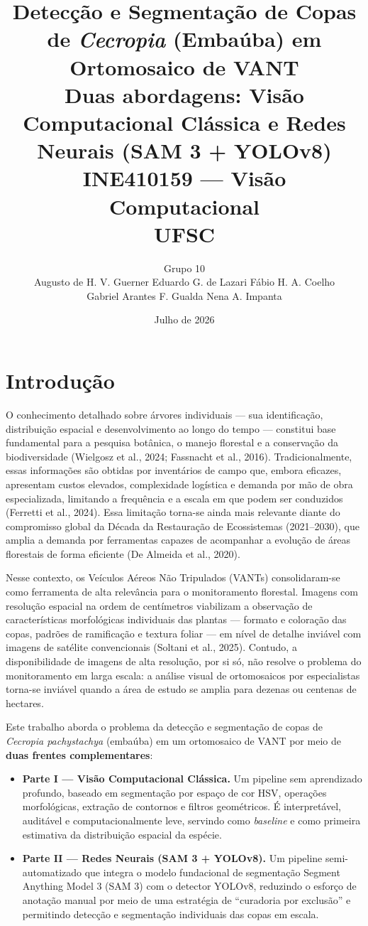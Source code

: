 \documentclass[12pt, a4paper]{article}
\title{
    \textbf{Detecção e Segmentação de Copas de \textit{Cecropia}
    (Embaúba) em Ortomosaico de VANT}\\[0.4em]
    \large Duas abordagens: Visão Computacional Clássica e
    Redes Neurais (SAM 3 + YOLOv8)\\[0.6em]
    \large INE410159 — Visão Computacional \\ UFSC
}
\author{Grupo 10 \\[0.3em]
\small Augusto de H. V. Guerner \quad Eduardo G. de Lazari \quad Fábio H. A. Coelho\\
\small Gabriel Arantes F. Gualda \quad Nena A. Impanta}
\date{Julho de 2026}
\begin{document}
\maketitle
\tableofcontents
\newpage

\section{Introdução}

O conhecimento detalhado sobre árvores individuais — sua identificação,
distribuição espacial e desenvolvimento ao longo do tempo — constitui base
fundamental para a pesquisa botânica, o manejo florestal e a conservação da
biodiversidade (Wielgosz et al., 2024; Fassnacht et al., 2016). Tradicionalmente,
essas informações são obtidas por inventários de campo que, embora eficazes,
apresentam custos elevados, complexidade logística e demanda por mão de obra
especializada, limitando a frequência e a escala em que podem ser conduzidos
(Ferretti et al., 2024). Essa limitação torna-se ainda mais relevante diante do
compromisso global da Década da Restauração de Ecossistemas (2021–2030), que
amplia a demanda por ferramentas capazes de acompanhar a evolução de áreas
florestais de forma eficiente (De Almeida et al., 2020).

Nesse contexto, os Veículos Aéreos Não Tripulados (VANTs) consolidaram-se como
ferramenta de alta relevância para o monitoramento florestal. Imagens com
resolução espacial na ordem de centímetros viabilizam a observação de
características morfológicas individuais das plantas — formato e coloração das
copas, padrões de ramificação e textura foliar — em nível de detalhe inviável com
imagens de satélite convencionais (Soltani et al., 2025). Contudo, a
disponibilidade de imagens de alta resolução, por si só, não resolve o problema do
monitoramento em larga escala: a análise visual de ortomosaicos por especialistas
torna-se inviável quando a área de estudo se amplia para dezenas ou centenas de
hectares.

Este trabalho aborda o problema da detecção e segmentação de copas de
\textit{Cecropia pachystachya} (embaúba) em um ortomosaico de VANT por meio de
\textbf{duas frentes complementares}:

\begin{itemize}
    \item \textbf{Parte I — Visão Computacional Clássica.} Um pipeline sem
    aprendizado profundo, baseado em segmentação por espaço de cor HSV, operações
    morfológicas, extração de contornos e filtros geométricos. É interpretável,
    auditável e computacionalmente leve, servindo como \textit{baseline} e como
    primeira estimativa da distribuição espacial da espécie.

    \item \textbf{Parte II — Redes Neurais (SAM 3 + YOLOv8).} Um pipeline
    semi-automatizado que integra o modelo fundacional de segmentação
    Segment Anything Model 3 (SAM 3) com o detector YOLOv8, reduzindo o esforço de
    anotação manual por meio de uma estratégia de ``curadoria por exclusão'' e
    permitindo detecção e segmentação individuais das copas em escala.
\end{itemize}
\end{document}
